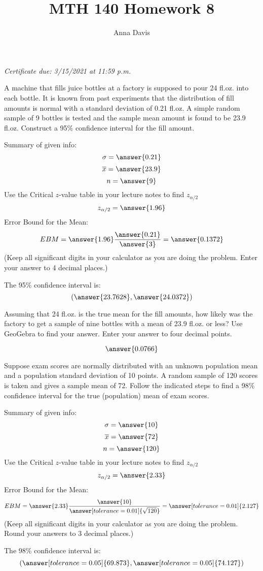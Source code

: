 \documentclass{ximera}
\author{Anna Davis} \title{MTH 140 Homework 8}
\begin{document}
\begin{abstract}

\end{abstract}
\maketitle
 \textit{Certificate due: 3/15/2021 at 11:59 p.m.}
\begin{problem}\label{prob:140hom6prob5}
A machine that fills juice bottles at a factory is supposed to pour 24 fl.oz. into each bottle.  It is known from past experiments that the distribution of fill amounts is normal with a standard deviation of 0.21 fl.oz. A simple random sample of 9 bottles is tested and the sample mean amount is found to be 23.9 fl.oz.  Construct a 95\% confidence interval for the fill amount. 

Summary of given info:
$$\sigma=\answer{0.21}$$
$$\overline{x}=\answer{23.9}$$
$$n=\answer{9}$$
Use the Critical $z$-value table in your lecture notes to find $z_{\alpha/2}$
$$z_{\alpha/2}=\answer{1.96}$$
Error Bound for the Mean:
$$EBM=\answer{1.96}\frac{\answer{0.21}}{\answer{3}}=\answer{0.1372}$$
(Keep all significant digits in your calculator as you are doing the problem.  Enter your answer to 4 decimal places.)

The 95\% confidence interval is:
$$(\answer{23.7628},\answer{24.0372})$$

Assuming that 24 fl.oz. is the true mean for the fill amounts, how likely was the factory to get a sample of nine bottles with a mean of 23.9 fl.oz. or less?  Use GeoGebra to find your answer.  Enter your answer to four decimal points.
\begin{center}  
\end{center}
$$\answer{0.0766}$$
\end{problem}


\begin{problem}\label{prob:140hom6prob4}
Suppose exam scores are normally distributed with an unknown population mean and a population standard deviation of 10 points. A random sample of 120 scores is taken and gives a sample mean of 72. Follow the indicated steps to find a 98\% confidence interval for the true (population) mean of exam scores.

Summary of given info:
$$\sigma=\answer{10}$$
$$\overline{x}=\answer{72}$$
$$n=\answer{120}$$
Use the Critical $z$-value table in your lecture notes to find $z_{\alpha/2}$
$$z_{\alpha/2}=\answer{2.33}$$
Error Bound for the Mean:
$$EBM=\answer{2.33}\frac{\answer{10}}{\answer[tolerance=0.01]{\sqrt{120}}}=\answer[tolerance=0.01]{2.127}$$
(Keep all significant digits in your calculator as you are doing the problem.  Round your answers to 3 decimal places.)

The 98\% confidence interval is:
$$(\answer[tolerance=0.05]{69.873},\answer[tolerance=0.05]{74.127})$$
\end{problem}
\end{document}
